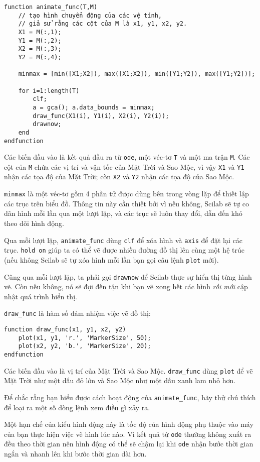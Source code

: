 \documentclass[12pt]{book}
\begin{document}
\begin{verbatim}
function animate_func(T,M)
    // tạo hình chuyển động của các vệ tính, 
    // giả sử rằng các cột của M là x1, y1, x2, y2.
    X1 = M(:,1);
    Y1 = M(:,2);
    X2 = M(:,3);
    Y2 = M(:,4);

    minmax = [min([X1;X2]), max([X1;X2]), min([Y1;Y2]), max([Y1;Y2])];

    for i=1:length(T)
        clf; 
        a = gca(); a.data_bounds = minmax;
        draw_func(X1(i), Y1(i), X2(i), Y2(i));
        drawnow;
    end
endfunction
\end{verbatim}
%
Các biến đầu vào là kết quả đầu ra từ {\tt ode}, một véc-tơ
{\tt T} và một ma trận {\tt M}. Các cột của {\tt M} chứa các
vị trí và vận tốc của Mặt Trời và Sao Mộc, vì vậy
{\tt X1} và {\tt Y1} nhận các tọa độ của Mặt Trời; còn
{\tt X2} và {\tt Y2} nhận các tọa độ của Sao Mộc.

{\tt minmax}  là một véc-tơ gồm 4 phần tử được dùng bên trong 
vòng lặp để thiết lập các trục trên biểu đồ. Thông tin này cần thiết
bởi vì nếu không, Scilab sẽ tự co dãn hình mỗi lần qua một
lượt lặp, và các trục sẽ luôn thay đổi, dẫn đến khó theo dõi
hình động.

Qua mỗi lượt lặp, \verb#animate_func# dùng {\tt clf}
để xóa hình và {\tt axis} để đặt lại các trục.  {\tt hold on} 
giúp ta có thể vẽ được nhiều đường đồ thị lên cùng một 
hệ trúc (nếu không Scilab sẽ tự xóa hình mỗi lần
bạn gọi câu lệnh {\tt plot} mới).

Cũng qua mỗi lượt lặp, ta phải gọi {\tt drawnow} để
Scilab thực sự hiển thị từng hình vẽ. Còn nếu không, nó sẽ
đợi đến tận khi bạn vẽ xong hết các hình {\em rồi mới} 
cập nhật quá trình hiển thị.

\verb#draw_func# là hàm số đảm nhiệm việc vẽ đồ thị:

\begin{verbatim}
function draw_func(x1, y1, x2, y2)
    plot(x1, y1, 'r.', 'MarkerSize', 50);
    plot(x2, y2, 'b.', 'MarkerSize', 20);
endfunction
\end{verbatim}
%
Các biến đầu vào là vị trí của Mặt Trời và Sao Mộc. \verb#draw_func#
dùng {\tt plot} để vẽ Mặt Trời như một dấu đỏ lớn và Sao Mộc như
một dấu xanh lam nhỏ hơn.

\begin{ex}
Để chắc rằng bạn hiểu được cách hoạt động của \verb#animate_func#,
hãy thử chú thích để loại ra một số dòng lệnh xem điều gì xảy ra.
\end{ex}

Một hạn chế của kiểu hình động này là tốc độ của hình động phụ thuộc
vào máy của bạn thực hiện việc vẽ hình lúc nào. Vì kết quả từ
{\tt ode} thường không xuất ra đều theo thời gian nên hình động
có thể sẽ chậm lại khi {\tt ode} nhận bước thời gian ngắn và
nhanh lên khi bước thời gian dài hơn.
\end{document}

